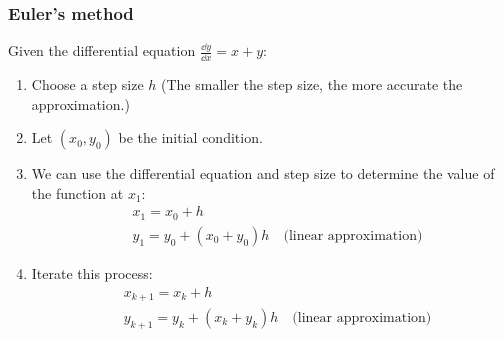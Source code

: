\subsubsection{Euler's method}
Given the differential equation $\frac{\dd y}{\dd x}=x+y$:
\begin{enumerate}
\item Choose a step size $h$ (The smaller the step size, the more accurate the approximation.)
\item Let $(x_0,y_0)$ be the initial condition.
\item We can use the differential equation and step size to determine the value of the function at $x_1$:
  \begin{align*}
  & x_1=x_0+h\\
  & y_1=y_0+(x_0+y_0)h\quad\text{(linear approximation)}
  \end{align*}
\item Iterate this process:
  \begin{align*}
  & x_{k+1}=x_k+h\\
  & y_{k+1}=y_k+(x_k+y_k)h\quad\text{(linear approximation)}
  \end{align*}
\end{enumerate}
